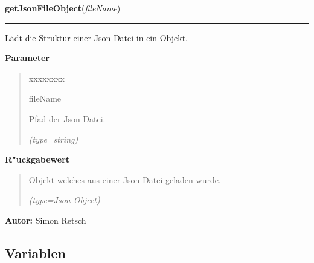 \hspace{.8\funcindent}\begin{boxedminipage}{\funcwidth}

    \raggedright \textbf{getJsonFileObject}(\textit{fileName})

    \vspace{-1.5ex}

    \rule{\textwidth}{0.5\fboxrule}
\setlength{\parskip}{2ex}
    Lädt die Struktur einer Json Datei in ein Objekt.

\setlength{\parskip}{1ex}
      \textbf{Parameter}
      \vspace{-1ex}

      \begin{quote}
        \begin{Ventry}{xxxxxxxx}

          \item[fileName]

          Pfad der Json Datei.

            {\it (type=string)}

        \end{Ventry}

      \end{quote}

      \textbf{R"uckgabewert}
    \vspace{-1ex}

      \begin{quote}
      Objekt welches aus einer Json Datei geladen wurde.

      {\it (type=Json Object)}

      \end{quote}

\textbf{Autor:} Simon Retsch



    \end{boxedminipage}



  \subsection{Variablen}

